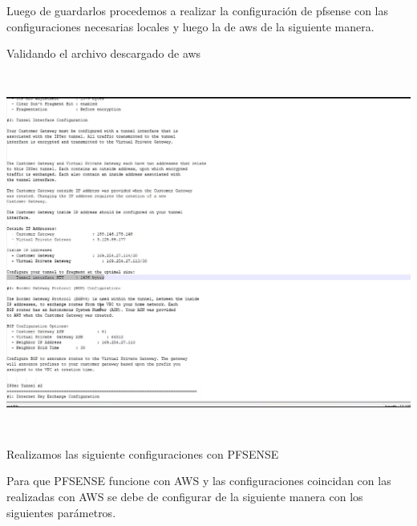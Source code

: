 \documentclass{article} %
\begin{document}
\noindent Luego de guardarlos procedemos a realizar la configuraci\'{o}n de pfsense con las configuraciones necesarias locales y luego la de aws de la siguiente manera.

\noindent 

\noindent Validando el archivo descargado de aws

\noindent 

\noindent \includegraphics*[width=6.05in, height=4.66in]{image24}

\noindent 

\noindent Realizamos las siguiente configuraciones con PFSENSE

\noindent 

\noindent 

\noindent 

\noindent 

\noindent 

\noindent 

\noindent 

\noindent 

\noindent 

\noindent 

\noindent 

\noindent 

\noindent 

\noindent Para que PFSENSE funcione con AWS y las configuraciones coincidan con las realizadas con AWS se debe de configurar de la siguiente manera con los siguientes par\'{a}metros. 
\end{document}
